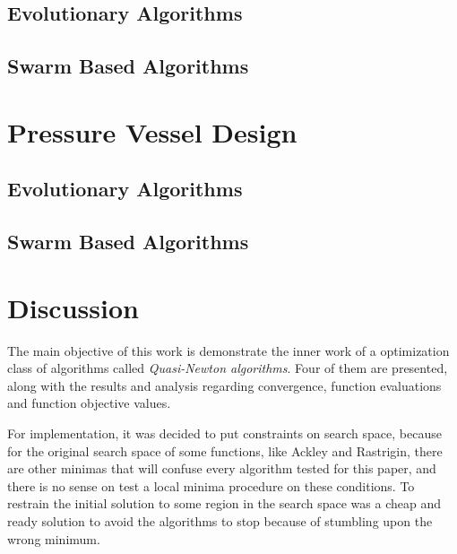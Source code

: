 \documentclass[conference]{IEEEtran}
\begin{document}
\label{sec:spring_problem}\subsection{Evolutionary Algorithms}

\label{subsec:spring_problem_evolutionary_based}

\subsection{Swarm Based Algorithms}

\label{subsec:spring_problem_swarm_based}

\section{Pressure Vessel Design}

\label{sec:pressure_vessel_problem}\subsection{Evolutionary Algorithms}

\label{subsec:pressure_vessel_problem_evolutionary_based}

\subsection{Swarm Based Algorithms}

\label{subsec:pressure_vessel_problem_swarm_based}



\section{Discussion}

The main objective of this work is demonstrate the inner work of a optimization class of algorithms called \textit{Quasi-Newton algorithms}. Four of them are presented, along with the results and analysis regarding convergence, function evaluations and function objective values.

For implementation, it was decided to put constraints on search space, because for the original search space of some functions, like Ackley and Rastrigin, there are other minimas that will confuse every algorithm tested for this paper, and there is no sense on test a local minima procedure on these conditions. To restrain the initial solution to some region in the search space was a cheap and ready solution to avoid the algorithms to stop because of stumbling upon the wrong minimum.
\end{document}

